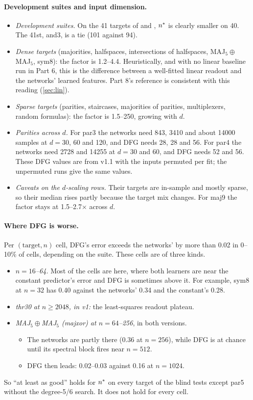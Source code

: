 \paragraph{Development suites and input dimension.}
\begin{itemize}
\item \emph{Development suites.} On the 41 targets of  and , $n^{*}$ is clearly smaller on 40. The 41st, and3, is a tie (101 against 94).
\item \emph{Dense targets} (majorities, halfspaces, intersections of halfspaces, MAJ$_5\oplus$MAJ$_5$, sym8): the factor is 1.2--4.4. Heuristically, and with no linear baseline run in Part 6, this is the difference between a well-fitted linear readout and the networks' learned features. Part 8's  reference is consistent with this reading (\cref{sec:lin}).
\item \emph{Sparse targets} (parities, staircases, majorities of parities, multiplexers, random formulas): the factor is 1.5--250, growing with $d$.
\item \emph{Parities across $d$.} For par3 the networks need 843, 3410 and about 14000 samples at $d=30$, 60 and 120, and DFG needs 28, 28 and 56. For par4 the networks need 2728 and 14255 at $d=30$ and 60, and DFG needs 52 and 56. These DFG values are from v1.1 with the inputs permuted per fit; the unpermuted runs give the same values.
\item \emph{Caveats on the $d$-scaling rows.} Their targets are in-sample and mostly sparse, so their median rises partly because the target mix changes. For maj9 the factor stays at 1.5--2.7$\times$ across $d$.
\end{itemize}

\paragraph{Where DFG is worse.} Per $(\text{target},n)$ cell, DFG's error exceeds the networks' by more than 0.02 in 0--10\% of cells, depending on the suite. These cells are of three kinds.
\begin{itemize}
\item \emph{$n=16$--64.} Most of the cells are here, where both learners are near the constant predictor's error and DFG is sometimes above it. For example, sym8 at $n=32$ has 0.40 against the networks' 0.34 and the constant's 0.28.
\item \emph{thr30 at $n\ge2048$, in v1:} the least-squares readout plateau.
\item \emph{MAJ$_5\oplus$MAJ$_5$ (majxor) at $n=64$--256}, in both versions.
  \begin{itemize}
  \item The networks are partly there (0.36 at $n=256$), while DFG is at chance until its spectral block fires near $n=512$.
  \item DFG then leads: 0.02--0.03 against 0.16 at $n=1024$.
  \end{itemize}
\end{itemize}
So ``at least as good'' holds for $n^{*}$ on every target of the blind tests except par5 without the degree-5/6 search. It does not hold for every cell.

